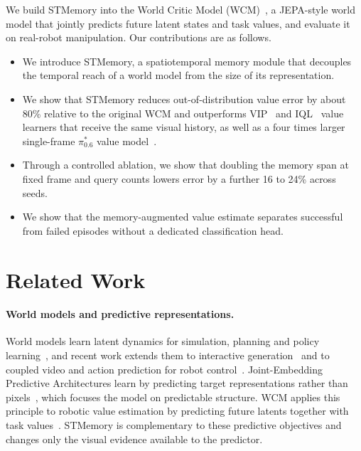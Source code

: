 \documentclass[10pt,a4paper]{article}
\begin{document}
We build STMemory into the World Critic Model (WCM)~\citep{fei2026wcm}, a JEPA-style world model that jointly predicts future latent states and task values, and evaluate it on real-robot manipulation. Our contributions are as follows.
\begin{itemize}[leftmargin=1.4em,itemsep=1pt,topsep=2pt]
\item We introduce STMemory, a spatiotemporal memory module that decouples the temporal reach of a world model from the size of its representation.
\item We show that STMemory reduces out-of-distribution value error by about 80\% relative to the original WCM and outperforms VIP~\citep{ma2023vip} and IQL~\citep{kostrikov2022iql} value learners that receive the same visual history, as well as a four times larger single-frame $\pi^{*}_{0.6}$ value model~\citep{pistar06}.
\item Through a controlled ablation, we show that doubling the memory span at fixed frame and query counts lowers error by a further 16 to 24\% across seeds.
\item We show that the memory-augmented value estimate separates successful from failed episodes without a dedicated classification head.
\end{itemize}

\section{Related Work}

\paragraph{World models and predictive representations.}
World models learn latent dynamics for simulation, planning and policy learning~\citep{ha2018worldmodels,hafner2019planet,hafner2025mastering}, and recent work extends them to interactive generation~\citep{bruce2024genie} and to coupled video and action prediction for robot control~\citep{wang2026dimwam,zhou2026rollingwam}. Joint-Embedding Predictive Architectures learn by predicting target representations rather than pixels~\citep{assran2023ijepa,bardes2024vjepa}, which focuses the model on predictable structure. WCM applies this principle to robotic value estimation by predicting future latents together with task values~\citep{fei2026wcm}. STMemory is complementary to these predictive objectives and changes only the visual evidence available to the predictor.
\end{document}
